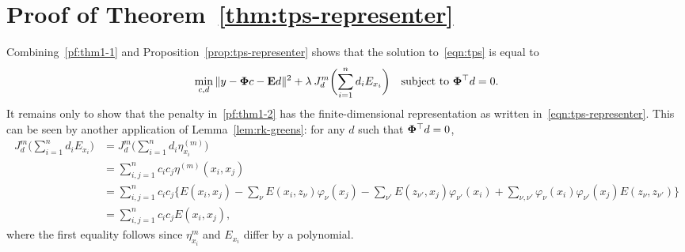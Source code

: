 \documentclass{article}
\begin{document}
\section{Proof of Theorem~\ref{thm:tps-representer}}
Combining~\eqref{pf:thm1-1} and Proposition~\ref{prop:tps-representer} shows that the solution to~\eqref{eqn:tps} is equal to
\begin{equation}
	\label{pf:thm1-2}
	\min_{c,d} \|y - {\bf \Phi} c - {\bf E} d\|^2 + \lambda \hspace{2 pt} J_d^m\biggl(\sum_{i = 1}^{n} d_i E_{x_i}\biggr) \quad \textrm{subject to ${\bf \Phi}^{\top}d = 0$.}
\end{equation}
It remains only to show that the penalty in~\eqref{pf:thm1-2} has the finite-dimensional representation as written in~\eqref{eqn:tps-representer}. This can be seen by another application of Lemma~\ref{lem:rk-greens}: for any $d$ such that ${\bf \Phi}^{\top} d = 0$,
\begin{align*}
	J_d^m\biggl(\sum_{i = 1}^{n} d_i E_{x_i}\biggr) & = J_d^m\biggl(\sum_{i = 1}^{n} d_i \eta_{x_i}^{(m)}\biggr) \\
	& = \sum_{i,j = 1}^{n} c_i c_j \eta^{(m)}(x_i,x_j) \\
	& = \sum_{i,j = 1}^{n} c_i c_j \biggl\{E(x_i,x_j) -  \sum_{\nu} E(x_i,z_{\nu}) \varphi_{\nu}(x_j) - \sum_{\nu'} E(z_{\nu'},x_j) \varphi_{\nu'}(x_i) + \sum_{\nu,\nu'} \varphi_{\nu}(x_i) \varphi_{\nu'}(x_j) E(z_{\nu},z_{\nu'}) \biggr\} \\
	& = \sum_{i,j = 1}^{n} c_i c_j E(x_i,x_j),
\end{align*}
where the first equality follows since $\eta_{x_i}^{m}$ and $E_{x_i}$ differ by a polynomial.



\end{document}
